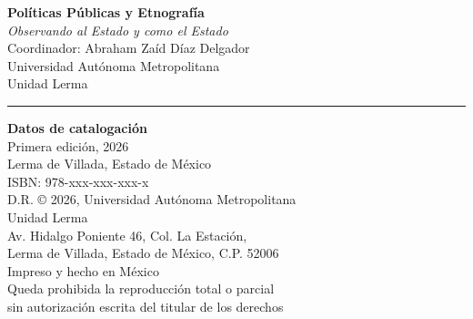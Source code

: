 \begin{titlepage}
    \thispagestyle{empty}
    \vspace*{2cm}
    \begin{center}
        \textbf{Políticas Públicas y Etnografía} \\
        \textit{Observando al Estado y como el Estado} \\
        \vspace{0.5cm}
        \small
        Coordinador: Abraham Zaíd Díaz Delgador \\
        Universidad Autónoma Metropolitana \\
        Unidad Lerma \\
        
        
        \rule{0.6\textwidth}{0.4pt}
        \vspace{0.5cm}
        
        \small
        \textbf{Datos de catalogación} \\
        \vspace{0.3cm}
        Primera edición, 2026 \\
        Lerma de Villada, Estado de México \\
        \vspace{0.3cm}
        ISBN: 978-xxx-xxx-xxx-x \\
        D.R. © 2026, Universidad Autónoma Metropolitana \\
        Unidad Lerma \\
        Av. Hidalgo Poniente 46, Col. La Estación, \\
        Lerma de Villada, Estado de México, C.P. 52006 \\
        \vspace{0.3cm}
        Impreso y hecho en México \\
        \vspace{0.3cm}
        Queda prohibida la reproducción total o parcial \\
        sin autorización escrita del titular de los derechos
    \end{center}
\end{titlepage}

\clearpage
\pagestyle{plain}  %